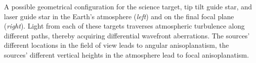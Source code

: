 A possible geometrical configuration for the science target, tip tilt guide star, and laser guide star in the Earth's atmosphere ({\em left}) and on the final focal plane ({\em right}). Light from each of these targets traverses atmospheric turbulence along different paths, thereby acquiring differential wavefront aberrations. The sources' different locations in the field of view leads to angular anisoplanatism, the sources' different vertical heights in the atmosphere lead to focal anisoplanatism. 
\label{fig:guide_star_schematic}
